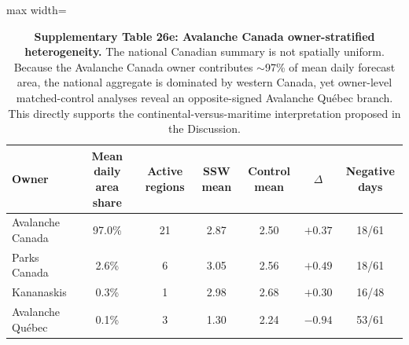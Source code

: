 \documentclass[11pt,letterpaper]{article}
\begin{document}
\begin{table}[!ht]
\centering
\caption{\textbf{Supplementary Table 26e: Avalanche Canada owner-stratified heterogeneity.}
The national Canadian summary is not spatially uniform. Because the Avalanche Canada owner contributes $\sim$97\% of mean daily forecast area, the national aggregate is dominated by western Canada, yet owner-level matched-control analyses reveal an opposite-signed Avalanche Qu\'ebec branch. This directly supports the continental-versus-maritime interpretation proposed in the Discussion.}
\label{tab:avcan_owner_split}
\small
\begin{adjustbox}{max width=\textwidth}
\begin{tabular}{lcccccc}
\toprule
Owner & Mean daily area share & Active regions & SSW mean & Control mean & $\Delta$ & Negative days \\
\midrule
Avalanche Canada & 97.0\% & 21 & 2.87 & 2.50 & $+0.37$ & 18/61 \\
Parks Canada & 2.6\% & 6 & 3.05 & 2.56 & $+0.49$ & 18/61 \\
Kananaskis & 0.3\% & 1 & 2.98 & 2.68 & $+0.30$ & 16/48 \\
Avalanche Qu\'ebec & 0.1\% & 3 & 1.30 & 2.24 & $-0.94$ & 53/61 \\
\bottomrule
\end{tabular}
\end{adjustbox}
\end{table}
\end{document}
